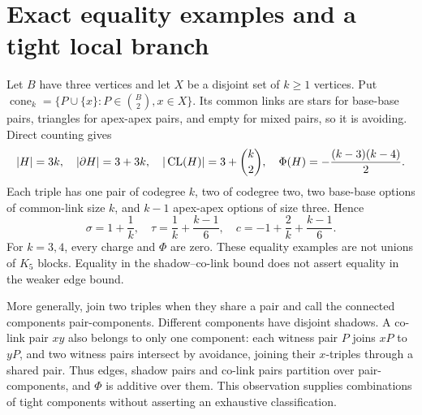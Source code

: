 \section{Exact equality examples and a tight local branch}
\label{app:examples}
Let $B$ have three vertices and let $X$ be a disjoint set of $k\ge1$ vertices. Put $\operatorname{cone}_k=\{P\cup\{x\}:P\in\binom B2,x\in X\}$. Its common links are stars for base-base pairs, triangles for apex-apex pairs, and empty for mixed pairs, so it is avoiding. Direct counting gives
\[
 |H|=3k,\quad |\partial H|=3+3k,\quad |\operatorname{CL}(H)|=3+\binom k2,
 \quad\Phi(H)=-\frac{(k-3)(k-4)}2.
\]
Each triple has one pair of codegree $k$, two of codegree two, two base-base options of common-link size $k$, and $k-1$ apex-apex options of size three. Hence
\[
 \sigma=1+\frac1k,\quad\tau=\frac1k+\frac{k-1}{6},\quad
 c=-1+\frac2k+\frac{k-1}{6}.
\]
For $k=3,4$, every charge and $\Phi$ are zero. These equality examples are not unions of $K_5$ blocks. Equality in the shadow--co-link bound does not assert equality in the weaker edge bound.

More generally, join two triples when they share a pair and call the connected components pair-components. Different components have disjoint shadows. A co-link pair $xy$ also belongs to only one component: each witness pair $P$ joins $xP$ to $yP$, and two witness pairs intersect by avoidance, joining their $x$-triples through a shared pair. Thus edges, shadow pairs and co-link pairs partition over pair-components, and $\Phi$ is additive over them. This observation supplies combinations of tight components without asserting an exhaustive classification.

